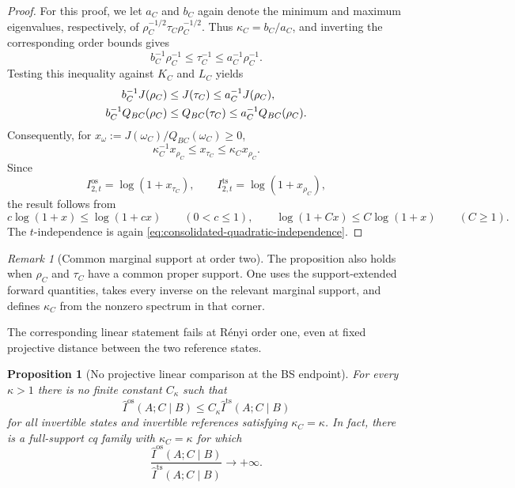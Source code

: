 \documentclass[11pt]{article}
\newtheorem{proposition}[proposition]{Proposition}
\theoremstyle{remark}
\newtheorem{remark}[remark]{Remark}
\DeclareMathOperator{\os}{os}
\DeclareMathOperator{\ts}{ts}
\newcommand{\1}{\mathbbm{1}}
\begin{document}
\begin{proof}
For this proof, we let $a_C$ and $b_C$ again denote the minimum and
maximum eigenvalues, respectively, of
$\rho_C^{-1/2}\tau_C\rho_C^{-1/2}$.  Thus
$\kappa_C=b_C/a_C$, and inverting the corresponding order bounds gives
\begin{equation}
 b_C^{-1}\rho_C^{-1}\leq\tau_C^{-1}
 \leq a_C^{-1}\rho_C^{-1}.
\end{equation}
Testing this inequality against $K_C$ and $L_C$ yields
\begin{align}
 b_C^{-1}J(\rho_C)&\leq J(\tau_C)
                       \leq a_C^{-1}J(\rho_C),\notag\\
 b_C^{-1}Q_{BC}(\rho_C)&\leq Q_{BC}(\tau_C)
                       \leq a_C^{-1}Q_{BC}(\rho_C).
 \label{eq:consolidated-quadratic-functional-comparison}
\end{align}
Consequently, for
$x_\omega:=J(\omega_C)/Q_{BC}(\omega_C)\geq0$,
\begin{equation}
 \kappa_C^{-1}x_{\rho_C}
 \leq x_{\tau_C}\leq\kappa_Cx_{\rho_C}.
\end{equation}
Since
\begin{equation}
 I_{2,t}^{\os}=\log(1+x_{\tau_C}),
 \qquad
 I_{2,t}^{\ts}=\log(1+x_{\rho_C}),
\end{equation}
the result follows from
\begin{equation}
 c\log(1+x)\leq\log(1+cx)\qquad(0<c\leq1),
 \qquad
 \log(1+Cx)\leq C\log(1+x)\qquad(C\geq1).
\end{equation}
The $t$-independence is again
\eqref{eq:consolidated-quadratic-independence}.
\end{proof}

\begin{remark}[Common marginal support at order two]
The proposition also holds when $\rho_C$ and $\tau_C$ have a common
proper support.  One uses the support-extended forward quantities,
takes every inverse on the relevant marginal support, and defines
$\kappa_C$ from the nonzero spectrum in that corner.
\end{remark}

The corresponding linear statement fails at R\'enyi order one, even
at fixed projective distance between the two reference states.

\begin{proposition}[No projective linear comparison at the BS endpoint]
\label{prop:consolidated-no-BS-projective-factor}
For every $\kappa>1$ there is no finite constant $C_\kappa$ such that
\begin{equation}
 \widehat I^{\os}(A;C\mid B)
 \leq C_\kappa\widehat I^{\ts}(A;C\mid B)
 \label{eq:consolidated-false-BS-factor}
\end{equation}
for all invertible states and invertible references satisfying
$\kappa_C=\kappa$.  In fact, there is a full-support cq family with
$\kappa_C=\kappa$ for which
\begin{equation}
 \frac{\widehat I^{\os}(A;C\mid B)}
      {\widehat I^{\ts}(A;C\mid B)}\longrightarrow+\infty.
 \label{eq:consolidated-BS-factor-divergence}
\end{equation}
\end{proposition}
\end{document}
